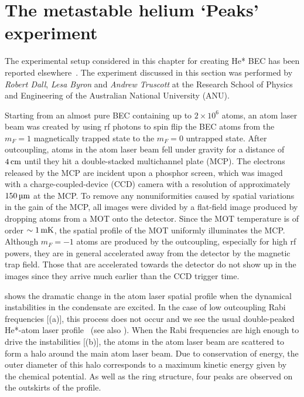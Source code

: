 \section{The metastable helium `Peaks' experiment}
\label{Peaks:ExperimentalSetup}

The experimental setup considered in this chapter for creating He* BEC has been reported elsewhere~\citep{Dall:2007a}. The experiment discussed in this section was performed by \emph{Robert Dall}, \emph{Lesa Byron} and \emph{Andrew Truscott} at the Research School of Physics and Engineering of the Australian National University (ANU).

Starting from an almost pure BEC containing up to $2\times 10^6$ atoms, an atom laser beam was created by using rf photons to spin flip the BEC atoms from the $m_F=1$ magnetically trapped state to the $m_F=0$ untrapped state.  After outcoupling, atoms in the atom laser beam fell under gravity for a distance of $\unit[4]{cm}$ until they hit a double-stacked multichannel plate (MCP).  The electrons released by the MCP are incident upon a phosphor screen, which was imaged with a charge-coupled-device (CCD) camera with a resolution of approximately $\unit[150]{\micro m}$ at the MCP.  To remove any nonuniformities caused by spatial variations in the gain of the MCP, all images were divided by a flat-field image produced by dropping atoms from a MOT onto the detector. Since the MOT temperature is of order $\sim\unit[1]{mK}$, the spatial profile of the MOT uniformly illuminates the MCP. Although $m_F=-1$ atoms are produced by the outcoupling, especially for high rf powers, they are in general accelerated away from the detector by the magnetic trap field. Those that are accelerated towards the detector do not show up in the images since they arrive much earlier than the CCD trigger time.

 shows the dramatic change in the atom laser spatial profile when the dynamical instabilities in the condensate are excited.  In the case of low outcoupling Rabi frequencies [(a)], this process does not occur and we see the usual double-peaked He*-atom laser profile~\citep{Dall:2007} (see also ). When the Rabi frequencies are high enough to drive the instabilities [(b)], the atoms in the atom laser beam are scattered to form a halo around the main atom laser beam.  Due to conservation of energy, the outer diameter of this halo corresponds to a maximum kinetic energy given by the chemical potential.  As well as the ring structure, four peaks are observed on the outskirts of the profile.

